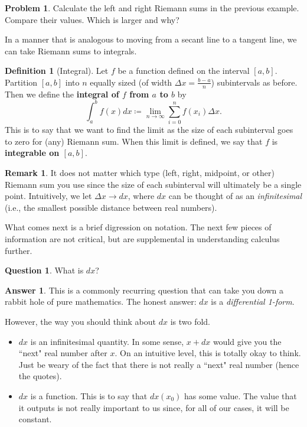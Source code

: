 \documentclass[12pt]{article}
\theoremstyle{definition}
\newtheorem{definition}{Definition}[section]
\newtheorem{remark}{Remark}[section]
\newtheorem{problem}{Problem}[section]
\newtheorem{question}{Question}[section]
\newtheorem{answer}{Answer}[section]
\begin{document}
\begin{problem}
Calculate the left and right Riemann sums in the previous example. Compare their values.  Which is larger and why?
\end{problem}

In a manner that is analogous to moving from a secant line to a tangent line, we can take Riemann sums to integrals. 

\begin{definition}[Integral]
Let $f$ be a function defined on the interval $[a,b]$. Partition $[a,b]$ into $n$ equally sized (of width $\Delta x = \frac{b-a}{n}$) subintervals as before.  Then we define the \textbf{integral of $f$ from $a$ to $b$} by
\[
\int_a^b f(x) dx \coloneqq \lim_{n\to \infty} \sum_{i=0}^n f(x_i) \Delta x.
\]
This is to say that we want to find the limit as the size of each subinterval goes to zero for (any) Riemann sum. When this limit is defined, we say that $f$ is \textbf{integrable on $[a,b]$}. 
\end{definition}

\begin{remark}
It does not matter which type (left, right, midpoint, or other) Riemann sum you use since the size of each subinterval will ultimately be a single point. Intuitively, we let $\Delta x \to dx$, where $dx$ can be thought of as an \emph{infinitesimal} (i.e., the smallest possible distance between real numbers).
\end{remark}

What comes next is a brief digression on notation.  The next few pieces of information are not critical, but are supplemental in understanding calculus further.

\begin{question}
What is $dx$? 
\end{question}

\begin{answer}
This is a commonly recurring question that can take you down a rabbit hole of pure mathematics. The honest answer: $dx$ is a \emph{differential 1-form}.  

However, the way you should think about $dx$ is two fold.
\begin{itemize}
    \item $dx$ is an infinitesimal quantity.  In some sense, $x+dx$ would give you the ``next" real number after $x$.  On an intuitive level, this is totally okay to think.  Just be weary of the fact that there is not really a ``next" real number (hence the quotes).
    \item $dx$ is a function. This is to say that $dx(x_0)$ has some value.  The value that it outputs is not really important to us since, for all of our cases, it will be constant. 
\end{itemize}
\end{answer}
\end{document}

